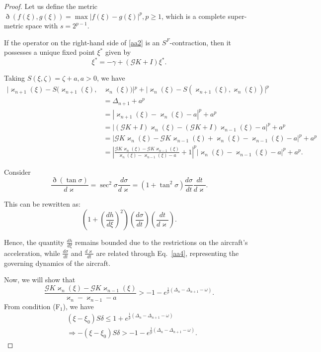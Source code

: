 \documentclass[10pt,a4paper]{amsart}
\begin{document}
\begin{proof}
    
 Let us define the metric $\eth(f(\xi), g(\xi)) = \max |f(\xi) - g(\xi)|^p,p\ge1$, which is a complete super-metric space with $s=2^{p-1}$.

If the operator on the right-hand side of \eqref{aa2} is an $S^F$-contraction, then it possesses a unique fixed point $\xi^*$ given by
\[
\xi^* = -\gamma + (\mathcal{G}K + I)\xi^*.
\]

Taking $S(\xi,\zeta)=\zeta+ a, a> 0$, we have
\begin{equation}\label{a1}
\begin{split}
|\varkappa_{n+1}(\xi)-S(\varkappa_{n+1}(\xi),&\varkappa_{n}(\xi))|^p+|\varkappa_{n}(\xi)-S(\varkappa_{n+1}(\xi),\varkappa_{n}(\xi))|^p\\
&= \Delta_{n+1}+a^p\\
&= \left|\varkappa_{n+1}(\xi) - \varkappa_{n}(\xi)-a\right|^p+a^p\\
&= \left|(\mathcal{G}K+I)\varkappa_{n}(\xi) - (\mathcal{G}K+I)\varkappa_{n-1}(\xi)-a\right|^p+a^p  \\
&= \left|\mathcal{G}K\varkappa_n(\xi) - \mathcal{G}K\varkappa_{n-1}(\xi) + \varkappa_n(\xi) - \varkappa_{n-1}(\xi)-a\right|^p+a^p \\
&= \left| \frac{\mathcal{G}K\varkappa_n(\xi) - \mathcal{G}K\varkappa_{n-1}(\xi)}{\varkappa_n(\xi) - \varkappa_{n-1}(\xi)-a} +1 \right|^p 
\left|\varkappa_n(\xi) - \varkappa_{n-1}(\xi)-a\right|^p+a^p. 
\end{split}
\end{equation}


Consider
\[
\frac{\eth(\tan \sigma)}{d\varkappa} = \sec^2\sigma\frac{d\sigma}{d\varkappa} = (1 + \tan^2 \sigma)\frac{d\sigma}{dt}\frac{dt}{d\varkappa}.
\]

This can be rewritten as:
\[
\left(1 + \left(\frac{dh}{d\xi} \right)^2\right)
\left(\frac{d\sigma}{dt}\right)\left(\frac{dt}{d\varkappa}\right).
\]

Hence, the quantity $\frac{dh}{d\xi}$ remains bounded due to the restrictions on the aircraft's acceleration, while $\frac{d\sigma}{dt}$ and $\frac{d\varkappa}{dt}$ are related through Eq.~\eqref{aa4}, representing the governing dynamics of the aircraft.

Now, we will show that \[
\frac{\mathcal{G}K\varkappa_n(\xi) - \mathcal{G}K\varkappa_{n-1}(\xi)}{\varkappa_n - \varkappa_{n-1}-a} > -1 - e^{\frac{1}{p}(\Delta_n-\Delta_{n+1}-\omega  )}.
\]
From condition (F$_1$), we have
\begin{equation}\label{a3}
\begin{split}
 &(\xi - \xi_0)S\delta \le 1 + e^{\frac{1}{p}(\Delta_n-\Delta_{n+1}-\omega  )} \\
&\Rightarrow  -(\xi - \xi_0)S\delta >- 1 - e^{\frac{1}{p}(\Delta_n-\Delta_{n+1}-\omega  )}. 
\end{split}
\end{equation}


\end{proof}
\end{document}
